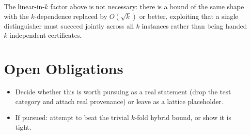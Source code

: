 \documentclass{conjura-conjecture}
\begin{document}
\begin{conjecture}
The linear-in-$k$ factor above is not necessary: there is a bound of the same shape with the
$k$-dependence replaced by $O(\sqrt{k})$ or better, exploiting that a single distinguisher must
succeed jointly across all $k$ instances rather than being handed $k$ independent certificates.
\end{conjecture}

\section{Open Obligations}

\begin{itemize}
  \item Decide whether this is worth pursuing as a real statement (drop the test category and attach
  real provenance) or leave as a lattice placeholder.
  \item If pursued: attempt to beat the trivial $k$-fold hybrid bound, or show it is tight.
\end{itemize}
\end{document}
